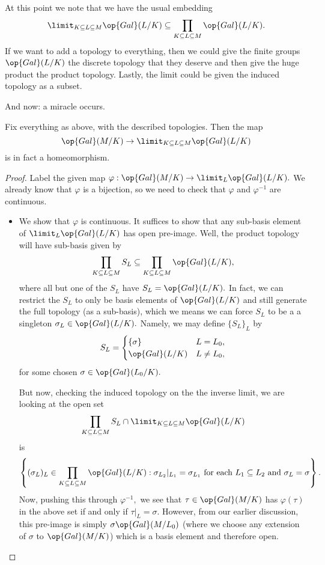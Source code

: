\documentclass[../notes.tex]{subfiles}
\begin{document}
At this point we note that we have the usual embedding
\[\limit_{K\subseteq L\subseteq M}\op{Gal}(L/K)\subseteq\prod_{K\subseteq L\subseteq M}\op{Gal}(L/K).\]
If we want to add a topology to everything, then we could give the finite groups $\op{Gal}(L/K)$ the discrete topology that they deserve and then give the huge product the product topology. Lastly, the limit could be given the induced topology as a subset.

And now: a miracle occurs.
\begin{theorem}
	Fix everything as above, with the described topologies. Then the map
	\[\op{Gal}(M/K)\to\limit_{K\subseteq L\subseteq M}\op{Gal}(L/K)\]
	is in fact a homeomorphism.
\end{theorem}
\begin{proof}
	Label the given map $\varphi:\op{Gal}(M/K)\to\limit_L\op{Gal}(L/K).$ We already know that $\varphi$ is a bijection, so we need to check that $\varphi$ and $\varphi^{-1}$ are continuous.
	\begin{itemize}
		\item We show that $\varphi$ is continuous. It suffices to show that any sub-basis element of $\limit_L\op{Gal}(L/K)$ has open pre-image. Well, the product topology will have sub-basis given by
		\[\prod_{K\subseteq L\subseteq M}S_L\subseteq\prod_{K\subseteq L\subseteq M}\op{Gal}(L/K),\]
		where all but one of the $S_L$ have $S_L=\op{Gal}(L/K).$ In fact, we can restrict the $S_L$ to only be basis elements of $\op{Gal}(L/K)$ and still generate the full topology (as a sub-basis), which we means we can force $S_L$ to be a a singleton $\sigma_L\in\op{Gal}(L/K).$ Namely, we may define $\{S_L\}_{L}$ by
		\[S_L=\begin{cases}
			\{\sigma\} & L=L_0, \\
			\op{Gal}(L/K) & L\ne L_0,
		\end{cases}\]
		for some chosen $\sigma\in\op{Gal}(L_0/K).$
		
		But now, checking the induced topology on the the inverse limit, we are looking at the open set
		\[\prod_{K\subseteq L\subseteq M}S_L\cap\limit_{K\subseteq L\subseteq M}\op{Gal}(L/K)\]
		is
		\[\left\{(\sigma_L)_L\in\prod_{K\subseteq L\subseteq M}\op{Gal}(L/K):\sigma_{L_2}|_{L_1}=\sigma_{L_1}\text{ for each }L_1\subseteq L_2\text{ and }\sigma_L=\sigma\right\}.\]
		Now, pushing this through $\varphi^{-1},$ we see that $\tau\in\op{Gal}(M/K)$ has $\varphi(\tau)$ in the above set if and only if $\tau|_L=\sigma.$ However, from our earlier discussion, this pre-image is simply $\sigma\op{Gal}(M/L_0)$ (where we choose any extension of $\sigma$ to $\op{Gal}(M/K)$) which is a basis element and therefore open.


\end{itemize}
\end{proof}
\end{document}
